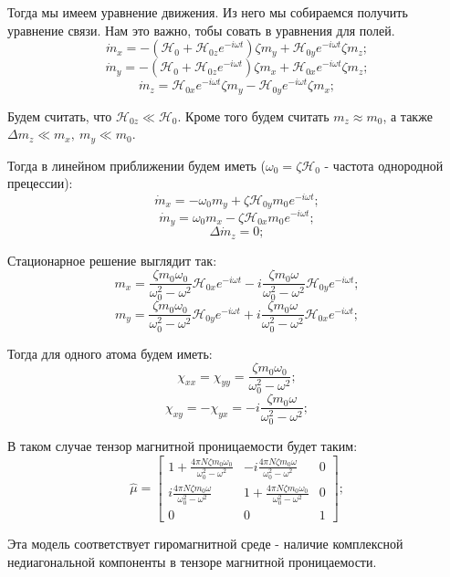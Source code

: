 \documentclass[a4paper, 14pt, russian]{article}
\newcommand{\be}{\begin{equation}}
\newcommand{\ee}{\end{equation}}
\begin{document}
	Тогда мы имеем уравнение движения. Из него мы собираемся получить уравнение связи.
	Нам это важно, тобы совать в уравнения для полей.
	\be
		\label{eq180}
		\dot{m}_x = -(\mathcal{H}_0 + \mathcal{H}_{0z}e^{-i\omega t}) \zeta m_y 
			+ \mathcal{H}_{0y}e^{-i\omega t} \zeta m_z;
	\ee
	\be
		\dot{m}_y = -(\mathcal{H}_0 + \mathcal{H}_{0z}e^{-i\omega t}) \zeta m_x 
			+ \mathcal{H}_{0x}e^{-i\omega t} \zeta m_z;
	\ee
	\be
		\dot{m}_z =
			\mathcal{H}_{0x}e^{-i\omega t} \zeta m_y - \mathcal{H}_{0y}e^{-i\omega t} \zeta m_x;
	\ee

	Будем считать, что $\mathcal{H}_{0z} \ll \mathcal{H}_0$. Кроме того 
	будем считать $m_z \approx m_0$, а также $\Delta m_z \ll m_x,~m_y \ll m_0$.

	Тогда в линейном приближении будем иметь ($\omega_0 = \zeta \mathcal{H}_0$ - частота однородной прецессии):
	\be
		\label{eq181}
		\dot{m}_x = - \omega_0 m_y + \zeta \mathcal{H}_{0y} m_0 e^{-i\omega t};
	\ee
	\be
		\dot{m}_y = \omega_0 m_x - \zeta \mathcal{H}_{0x} m_0 e^{-i\omega t};
	\ee
	\be
		\Delta \dot{m}_z = 0;
	\ee

	Стационарное решение выглядит так:
	\be
			m_x = \frac{\zeta m_0 \omega_0}{\omega_0^2 - \omega^2} 
				\mathcal{H}_{0x} e^{-i\omega t} - i 
				\frac{\zeta m_0 \omega}{\omega_0^2 - \omega^2} 
				\mathcal{H}_{0y} e^{-i\omega t};
	\ee
	\be
			m_y = \frac{\zeta m_0 \omega_0}{\omega_0^2 - \omega^2} 
				\mathcal{H}_{0y} e^{-i\omega t} + i 
				\frac{\zeta m_0 \omega}{\omega_0^2 - \omega^2} 
				\mathcal{H}_{0x} e^{-i\omega t};
	\ee

	Тогда для одного атома будем иметь:
	\be
		\chi_{xx} = \chi_{yy} = \frac{\zeta m_0 \omega_0}{\omega_0^2 - \omega^2};
	\ee
	\be
		\chi_{xy} = -\chi_{yx} = -i \frac{\zeta m_0 \omega}{\omega_0^2 - \omega^2};
	\ee

	В таком случае тензор магнитной проницаемости будет таким:
	\be
		\label{eq182}
		\hat{\mu} = 
			\begin{bmatrix}
				1 + \frac{4\pi N \zeta m_0 \omega_0}{\omega_0^2 - \omega^2 }
				& 
				-i \frac{4 \pi N \zeta m_0 \omega}{\omega_0^2 - \omega^2}
				&
				0\\
				i \frac{4 \pi N \zeta m_0 \omega}{\omega_0^2 - \omega^2}
				&
				1 + \frac{4\pi N \zeta m_0 \omega_0}{\omega_0^2 - \omega^2 }
				& 
				0\\
				0 & 0 & 1
			\end{bmatrix};
	\ee

	Эта модель соответствует гиромагнитной среде - наличие комплексной 
	недиагональной компоненты в тензоре магнитной проницаемости.
\end{document}
